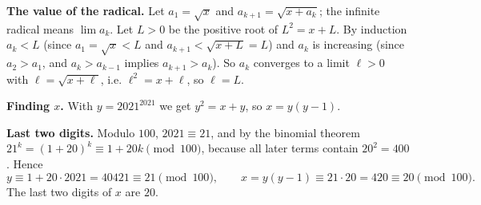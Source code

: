 \textbf{The value of the radical.} Let $a_1=\sqrt x$ and $a_{k+1}=\sqrt{x+a_k}$; the infinite radical means $\lim a_k$. Let $L>0$ be the positive root of $L^2=x+L$. By induction $a_k<L$ (since $a_1=\sqrt x<L$ and $a_{k+1}<\sqrt{x+L}=L$) and $a_k$ is increasing (since $a_2>a_1$, and $a_k>a_{k-1}$ implies $a_{k+1}>a_k$). So $a_k$ converges to a limit $\ell>0$ with $\ell=\sqrt{x+\ell}$, i.e. $\ell^2=x+\ell$, so $\ell=L$.

\textbf{Finding $x$.} With $y=2021^{2021}$ we get $y^2=x+y$, so $x=y(y-1)$.

\textbf{Last two digits.} Modulo $100$, $2021\equiv21$, and by the binomial theorem $21^k=(1+20)^k\equiv1+20k\pmod{100}$, because all later terms contain $20^2=400$. Hence
\[y\equiv1+20\cdot2021=40421\equiv21\pmod{100},\qquad x=y(y-1)\equiv21\cdot20=420\equiv20\pmod{100}.\]
The last two digits of $x$ are $\boxed{20}$.
